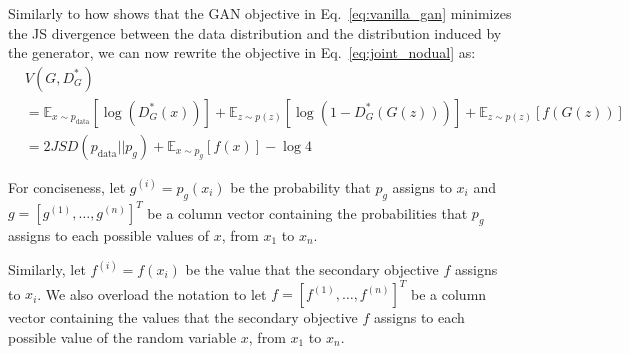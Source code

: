 Similarly to how \cite{gan} shows that the GAN objective in Eq.~\ref{eq:vanilla_gan} minimizes the JS divergence between the data distribution and the distribution induced by the generator, we can now rewrite the objective in Eq.~\ref{eq:joint_nodual} as:
\begin{align}
     & V(G, D^*_G)\\
     & = \mathbb{E}_{ x \sim p_{\text{data}}} [\log(D^*_G(x))] + \mathbb{E}_{z \sim p(z)} [\log(1-D^*_G(G(z)))]  + \mathbb{E}_{z \sim p(z)} [ f ( G(z) ) ] \\
     & = 2JSD( p_{\text{data}} || p_g ) + \mathbb{E}_{x \sim p_g} [ f ( x ) ] - \log 4 
\end{align}

For conciseness, let $g^{(i)} = p_g(x_i)$ be the probability that $p_g$ assigns to $x_i$  and $g = [g^{(1)}, \ldots, g^{(n)}]^T$ be a column vector containing the probabilities that $p_g$ assigns to each possible values of $x$, from $x_1$ to $x_n$. 

Similarly, let $f^{(i)} = f(x_i)$ be the value that the secondary objective $f$ assigns to $x_i$. We also overload the notation to let $f = [f^{(1)}, \ldots, f^{(n)}]^T$ be a column vector containing the values that the secondary objective $f$ assigns to each possible value of the random variable $x$, from $x_1$ to $x_n$. 

